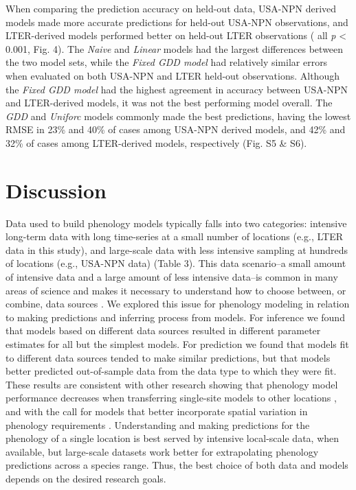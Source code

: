 \documentclass[fleqn,12pt,lineno]{article}
\begin{document}
When comparing the prediction accuracy on held-out data, USA-NPN derived models made more accurate predictions for held-out USA-NPN observations, and LTER-derived models performed better on held-out LTER observations ( all \textit{p} < 0.001, Fig. 4). The \textit{Naive} and \textit{Linear} models had the largest differences between the two model sets, while the \textit{Fixed GDD model} had relatively similar errors when evaluated on both USA-NPN and LTER held-out observations. Although the \textit{Fixed GDD model} had the highest agreement in accuracy between USA-NPN and LTER-derived models, it was not the best performing model overall. The \textit{GDD} and \textit{Uniforc} models commonly made the best predictions, having the lowest RMSE in 23\% and 40\% of cases among USA-NPN derived models, and 42\% and 32\% of cases among LTER-derived models, respectively (Fig. S5 \& S6).

\section*{Discussion}

Data used to build phenology models typically falls into two categories: intensive long-term data with long time-series at a small number of locations (e.g., LTER data in this study), and large-scale data with less intensive sampling at hundreds of locations (e.g., USA-NPN data) (Table 3). This data scenario--a small amount of intensive data and a large amount of less intensive data--is common in many areas of science and makes it necessary to understand how to choose between, or combine, data sources \citep{hanks2018}. We explored this issue for phenology modeling in relation to making predictions and inferring process from models. For inference we found that models based on different data sources resulted in different parameter estimates for all but the simplest models. For prediction we found that models fit to different data sources tended to make similar predictions, but that models better predicted out-of-sample data from the data type to which they were fit. These results are consistent with other research showing that phenology model performance decreases when transferring single-site models to other locations \citep{garcia-mozo2008, xu2013, basler2016}, and with the call for models that better incorporate spatial variation in phenology requirements \citep{richardson2013, chuine2017}. Understanding and making predictions for the phenology of a single location is best served by intensive local-scale data, when available, but large-scale datasets work better for extrapolating phenology predictions across a species range. Thus, the best choice of both data and models depends on the desired research goals.
\end{document}
